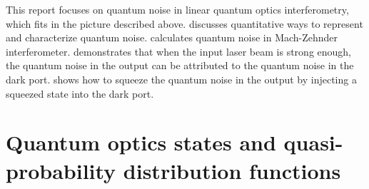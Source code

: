 \documentclass[hyperref, a4paper]{article}
\begin{document}

This report focuses on quantum noise in linear quantum optics interferometry,
which fits in the picture described above.
 discusses quantitative ways to represent and characterize quantum noise.
 calculates quantum noise 
in Mach-Zehnder interferometer.
 demonstrates that
when the input laser beam is strong enough,
the quantum noise in the output can be attributed to the quantum noise in the dark port.
 shows how to squeeze the quantum noise in the output 
by injecting a squeezed state into the dark port.

\section{Quantum optics states and quasi-probability distribution functions}\label{sec:overview-rep}
\end{document}
